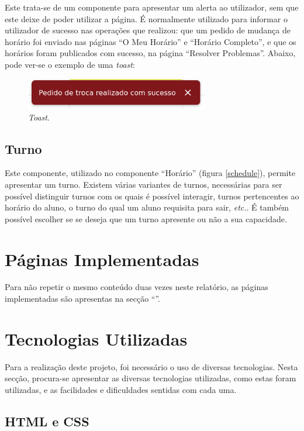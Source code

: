 \documentclass[12pt, a4paper]{article}
\begin{document}
Este trata-se de um componente para apresentar um alerta ao utilizador, sem que este deixe de poder
utilizar a página. É normalmente utilizado para informar o utilizador de sucesso nas operações que
realizou: que um pedido de mudança de horário foi enviado nas páginas ``O Meu Horário'' e
``Horário Completo'', e que os horários foram publicados com sucesso, na página
``Resolver Problemas''. Abaixo, pode ver-se o exemplo de uma \emph{toast}:

\begin{figure}[H]
    \centering
    \includegraphics[width=8cm]{res/components/toast.png}
    \caption{\emph{Toast}.}
    \label{toast}
\end{figure}

\subsection{Turno}

Este componente, utilizado no componente ``Horário'' (figura \ref{schedule}), permite apresentar um
turno. Existem várias variantes de turnos, necessárias para ser possível distinguir turnos com os
quais é possível interagir, turnos pertencentes ao horário do aluno, o turno do qual um aluno
requisita para sair, \emph{etc.}. É também possível escolher se se deseja que um turno apresente ou
não a sua capacidade.

\section{Páginas Implementadas}

Para não repetir o mesmo conteúdo duas vezes neste relatório, as páginas implementadas são
apresentas na secção ``''.

\section{Tecnologias Utilizadas}

Para a realização deste projeto, foi necessário o uso de diversas tecnologias. Nesta secção,
procura-se apresentar as diversas tecnologias utilizadas, como estas foram utilizadas, e as
facilidades e dificuldades sentidas com cada uma.

\subsection{HTML e CSS}
\end{document}
